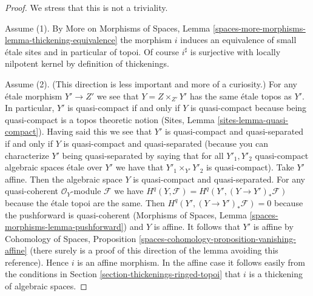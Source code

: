 \documentclass[10pt,a4paper]{amsart}
\theoremstyle{plain}
\theoremstyle{definition}
\theoremstyle{remark}
\numberwithin{equation}{subsection}
\begin{document}
\begin{proof}
We stress that this is not a triviality.

\medskip\noindent
Assume (1). By More on Morphisms of Spaces, Lemma
\ref{spaces-more-morphisms-lemma-thickening-equivalence}
the morphism $i$ induces an equivalence of small \'etale
sites and in particular of topoi. Of course $i^\sharp$
is surjective with locally nilpotent kernel by definition
of thickenings.

\medskip\noindent
Assume (2). (This direction is less important and more of
a curiosity.) For any \'etale morphism $Y' \to Z'$ we see
that $Y = Z \times_{Z'} Y'$ has the same \'etale topos
as $Y'$. In particular, $Y'$ is quasi-compact if and only if
$Y$ is quasi-compact because being quasi-compact
is a topos theoretic notion (Sites, Lemma \ref{sites-lemma-quasi-compact}).
Having said this we see that $Y'$ is quasi-compact and quasi-separated
if and only if $Y$ is quasi-compact and quasi-separated
(because you can characterize $Y'$ being quasi-separated by saying
that for all $Y'_1, Y'_2$ quasi-compact algebraic spaces \'etale over $Y'$
we have that $Y'_1 \times_{Y'} Y'_2$ is quasi-compact).
Take $Y'$ affine. Then the algebraic space $Y$ is
quasi-compact and quasi-separated. For any
quasi-coherent $\mathcal{O}_Y$-module $\mathcal{F}$ we have
$H^q(Y, \mathcal{F}) = H^q(Y', (Y \to Y')_*\mathcal{F})$
because the \'etale topoi are the same.
Then $H^q(Y', (Y \to Y')_*\mathcal{F}) = 0$
because the pushforward is quasi-coherent
(Morphisms of Spaces, Lemma \ref{spaces-morphisms-lemma-pushforward})
and $Y$ is affine. It follows that $Y'$ is affine by
Cohomology of Spaces, Proposition
\ref{spaces-cohomology-proposition-vanishing-affine}
(there surely is a proof of this direction of the lemma
avoiding this reference).
Hence $i$ is an affine morphism. In the affine case it
follows easily from the conditions in
Section \ref{section-thickenings-ringed-topoi}
that $i$ is a thickening of algebraic spaces.
\end{proof}
\end{document}
